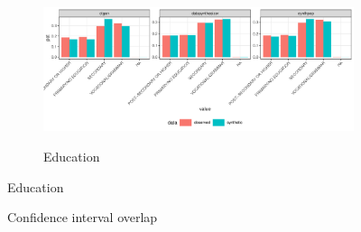 \begin{figure}[ht]
    \begin{subfigure}{\textwidth}
        \centering        
        \caption{Education}
        \includegraphics[width=.9\linewidth]{../graphs/graph_frequency_compare_edu.pdf}
        \label{subfig:graph_frequency_compare_edu}
    \end{subfigure}

\end{figure}

\begin{figure}
    \caption{Confidence interval overlap}
    \label{fig:utility_compare_cio}
\end{figure}
